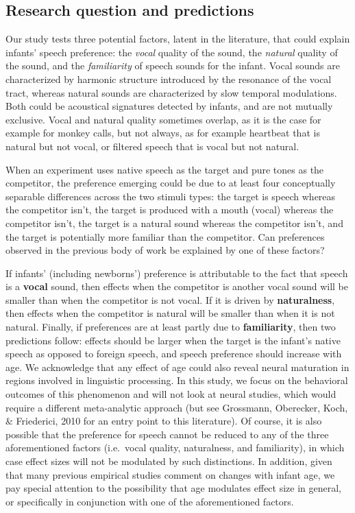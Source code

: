 \documentclass[
  man,mask,floatsintext]{apa6}
\begin{document}
\hypertarget{research-question-and-predictions}{%
\subsection{Research question and predictions}\label{research-question-and-predictions}}

Our study tests three potential factors, latent in the literature, that could explain infants' speech preference: the \emph{vocal} quality of the sound, the \emph{natural} quality of the sound, and the \emph{familiarity} of speech sounds for the infant. Vocal sounds are characterized by harmonic structure introduced by the resonance of the vocal tract, whereas natural sounds are characterized by slow temporal modulations. Both could be acoustical signatures detected by infants, and are not mutually exclusive. Vocal and natural quality sometimes overlap, as it is the case for example for monkey calls, but not always, as for example heartbeat that is natural but not vocal, or filtered speech that is vocal but not natural.

When an experiment uses native speech as the target and pure tones as the competitor, the preference emerging could be due to at least four conceptually separable differences across the two stimuli types: the target is speech whereas the competitor isn't, the target is produced with a mouth (vocal) whereas the competitor isn't, the target is a natural sound whereas the competitor isn't, and the target is potentially more familiar than the competitor. Can preferences observed in the previous body of work be explained by one of these factors?

If infants' (including newborns') preference is attributable to the fact that speech is a \textbf{vocal} sound, then effects when the competitor is another vocal sound will be smaller than when the competitor is not vocal. If it is driven by \textbf{naturalness}, then effects when the competitor is natural will be smaller than when it is not natural. Finally, if preferences are at least partly due to \textbf{familiarity}, then two predictions follow: effects should be larger when the target is the infant's native speech as opposed to foreign speech, and speech preference should increase with age. We acknowledge that any effect of age could also reveal neural maturation in regions involved in linguistic processing. In this study, we focus on the behavioral outcomes of this phenomenon and will not look at neural studies, which would require a different meta-analytic approach (but see Grossmann, Oberecker, Koch, \& Friederici, 2010 for an entry point to this literature). Of course, it is also possible that the preference for speech cannot be reduced to any of the three aforementioned factors (i.e.~vocal quality, naturalness, and familiarity), in which case effect sizes will not be modulated by such distinctions. In addition, given that many previous empirical studies comment on changes with infant age, we pay special attention to the possibility that age modulates effect size in general, or specifically in conjunction with one of the aforementioned factors.
\end{document}
